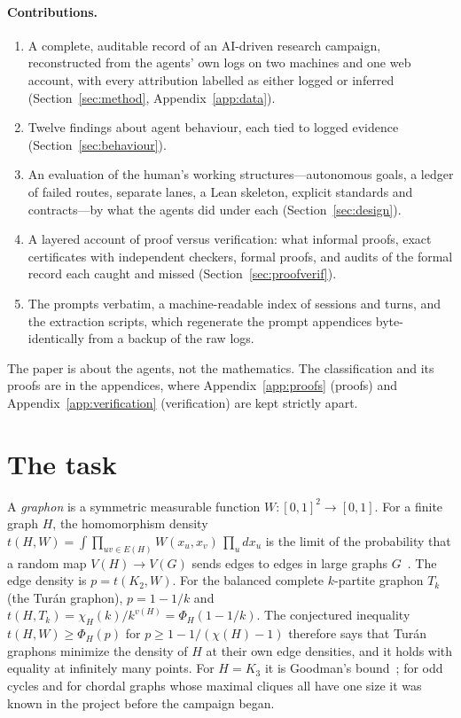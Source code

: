\documentclass[11pt,a4paper]{article}
\begin{document}
\paragraph{Contributions.}
\begin{enumerate}
\item A complete, auditable record of an AI-driven research campaign, reconstructed from the agents' own logs
  on two machines and one web account, with every attribution labelled as either logged or inferred
  (Section~\ref{sec:method}, Appendix~\ref{app:data}).
\item Twelve findings about agent behaviour, each tied to logged evidence (Section~\ref{sec:behaviour}).
\item An evaluation of the human's working structures---autonomous goals, a ledger of failed routes, separate
  lanes, a Lean skeleton, explicit standards and contracts---by what the agents did under each
  (Section~\ref{sec:design}).
\item A layered account of proof versus verification: what informal proofs, exact certificates with
  independent checkers, formal proofs, and audits of the formal record each caught and missed
  (Section~\ref{sec:proofverif}).
\item The prompts verbatim, a machine-readable index of sessions and turns, and the extraction scripts, which
  regenerate the prompt appendices byte-identically from a backup of the raw logs.
\end{enumerate}

The paper is about the agents, not the mathematics. The classification and its proofs are in the appendices,
where Appendix~\ref{app:proofs} (proofs) and Appendix~\ref{app:verification} (verification) are kept strictly
apart.

\section{The task}\label{sec:task}

A \emph{graphon} is a symmetric measurable function $W\colon[0,1]^2\to[0,1]$. For a finite graph $H$, the
homomorphism density $t(H,W)=\int\prod_{uv\in E(H)}W(x_u,x_v)\,\prod_u dx_u$ is the limit of the
probability that a random map $V(H)\to V(G)$ sends edges to edges in large graphs $G$~\cite{lovasz2012}. The
edge density is $p=t(K_2,W)$. For the balanced complete $k$-partite graphon $T_k$ (the Tur\'an graphon), $p=1-1/k$ and
$t(H,T_k)=\chi_H(k)/k^{v(H)}=\Phi_H(1-1/k)$. The conjectured inequality $t(H,W)\ge\Phi_H(p)$ for
$p\ge1-1/(\chi(H)-1)$ therefore says that Tur\'an graphons minimize the density of $H$ at their own edge
densities, and it holds with equality at infinitely many points. For $H=K_3$ it is Goodman's
bound~\cite{goodman1959}; for odd cycles and for chordal graphs whose maximal cliques all have one size it was
known in the project before the campaign began.
\end{document}
